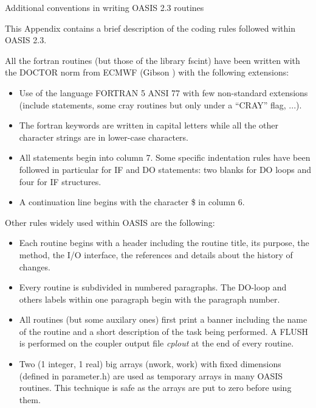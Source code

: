 \newpage
\begin{section}{Additional conventions in writing OASIS 2.3 routines}
\label{app_conventions}

This Appendix contains a brief description of the coding rules
followed within OASIS 2.3. 

All the fortran routines (but those of the library fscint) have been written
with the DOCTOR norm from ECMWF (Gibson \cite{doctor}) with the following 
extensions:
  \begin{itemize}

      \item Use of the language FORTRAN 5 ANSI 77 with few non-standard
            extensions (include statements, some cray routines but only 
            under a ``CRAY'' flag, ...).

      \item The fortran keywords are written in capital letters while
            all the other character strings are in lower-case characters.

      \item All statements begin into column 7.
            Some specific indentation rules have been followed in particular
            for IF and DO statements: two blanks for DO loops and four for
            IF structures.

      \item A continuation line begins with the character \$ in column 6.

  \end{itemize}

Other rules widely used within OASIS are the following:
  \begin{itemize}

      \item Each routine begins with a header including the routine
            title, its purpose, the method, the I/O interface, the
            references and details about the history of changes.


      \item Every routine is subdivided in numbered paragraphs.
            The DO-loop and others labels within one paragraph
            begin with the paragraph number.

      \item All routines (but some auxilary ones) first print a banner
            including the name of the routine and a short description
            of the task being performed.
            A FLUSH is performed on the coupler output file {\em cplout}
            at the end of every routine.

      \item Two (1 integer, 1 real) big arrays (nwork, work) with fixed 
            dimensions (defined in parameter.h) are used 
            as temporary arrays in many OASIS routines. This technique
            is safe as the arrays are put to zero  before
            using them.

  \end{itemize}



\end{section}
